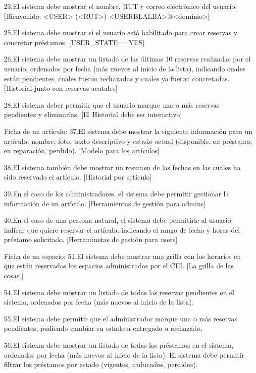 	23.El sistema debe mostrar el nombre, RUT y correo electrónico del usuario.
		[Bienvenido: <USER> (<RUT>) <USERBLALBA>@<dominio>]
	
	25.El sistema debe mostrar si el usuario está habilitado para crear reservas y concretar préstamos.
		[USER_STATE==YES]
	
	26.El sistema debe mostrar un listado de las últimas 10 reservas realizadas por el usuario, ordenados por fecha (más nuevos al inicio de la lista), indicando cuales están pendientes, cuales fueron rechazadas y cuales ya fueron concretadas.
		[Historial junto con reservas acutales]

	28.El sistema deber permitir que el usuario marque una o más reservas pendientes y eliminarlas.
		[El Historial debe ser interactivo]

Ficha de un artículo:
	37.El sistema debe mostrar la siguiente información para un artículo: nombre, foto, texto descriptivo y estado actual (disponible, en préstamo, en reparación, perdido).
		[Modelo para los artículos]

	38.El sistema también debe mostrar un resumen de las fechas en las cuales ha sido reservado el artículo.
		[Historial por artículo]
	
	39.En el caso de los administradores, el sistema debe permitir gestionar la información de un artículo.
		[Herramientas de gestión para admins]

	40.En el caso de una persona natural, el sistema debe permitirle al usuario indicar que quiere reservar el artículo, indicando el rango de fecha y horas del préstamo solicitado.
		[Herraminetas de gestión para users]

Ficha de un espacio:
	51.El sistema debe mostrar una grilla con los horarios en que están reservadas los espacios administrados por el CEI.
		[La grilla de las cosas.]

	54.El sistema debe mostrar un listado de todas las reservas pendientes en el sistema, ordenados por fecha (más nuevos al inicio de la lista).
			

	55.El sistema debe permitir que el administrador marque una o más reservas pendientes, pudiendo cambiar su estado a entregado o rechazado.
		

	56.El sistema debe mostrar un listado de todas los préstamos en el sistema, ordenados por fecha (más nuevos al inicio de la lista). El sistema debe permitir filtrar los préstamos por estado (vigentes, caducados, perdidos).